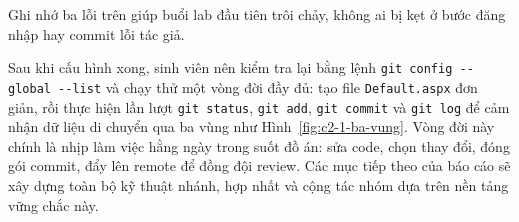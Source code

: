 Ghi nhớ ba lỗi trên giúp buổi lab đầu tiên trôi chảy, không ai bị kẹt ở bước đăng nhập hay commit lỗi tác giả.

Sau khi cấu hình xong, sinh viên nên kiểm tra lại bằng lệnh \verb|git config --global --list| và chạy thử một vòng đời đầy đủ: tạo file \texttt{Default.aspx} đơn giản, rồi thực hiện lần lượt \verb|git status|, \verb|git add|, \verb|git commit| và \verb|git log| để cảm nhận dữ liệu di chuyển qua ba vùng như Hình~\ref{fig:c2-1-ba-vung}. Vòng đời này chính là nhịp làm việc hằng ngày trong suốt đồ án: sửa code, chọn thay đổi, đóng gói commit, đẩy lên remote để đồng đội review. Các mục tiếp theo của báo cáo sẽ xây dựng toàn bộ kỹ thuật nhánh, hợp nhất và cộng tác nhóm dựa trên nền tảng vững chắc này.
